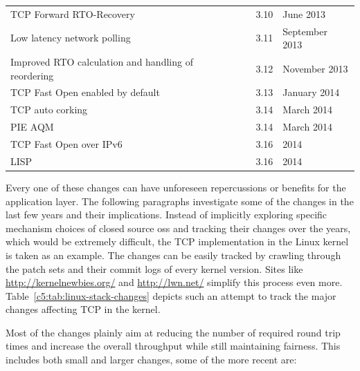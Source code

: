 \begin{table}[htbp]
\begin{tabu}{X[1.4]X[0.6]X[0.4]X[0.7]}
	\gls{TCP} Forward RTO-Recovery & \cite{rfc5682} & 3.10 & June 2013 \\
	Low latency network polling & & 3.11 & September 2013 \\ %
	Improved RTO calculation and handling of reordering & & 3.12 & November 2013 \\ %
	\gls{TCP} Fast Open enabled by default & & 3.13 & January 2014 \\
	\gls{TCP} auto corking & & 3.14 & March 2014 \\ %
	PIE \acrshort{AQM} & & 3.14 & March 2014 \\ %
	\gls{TCP} Fast Open over IPv6 & & 3.16 & 2014 \\
	LISP & \cite{rfc6830} & 3.16 & 2014 \\
	\bottomrule
	\end{tabu}
\end{table}

Every one of these changes can have unforeseen repercussions or benefits for the application layer. The following paragraphs investigate some of the changes in the last few years and their implications.  Instead of implicitly exploring specific mechanism choices of closed source \glspl{os} and tracking their changes over the years, which would be extremely difficult, the \gls{TCP} implementation in the Linux kernel is taken as an example. The changes can be easily tracked by crawling through the patch sets and their commit logs of every kernel version. Sites like \url{http://kernelnewbies.org/} and \url{http://lwn.net/} simplify this process even more. Table~\ref{c5:tab:linux-stack-changes} depicts such an attempt to track the major changes affecting \gls{TCP} in the kernel.

Most of the changes plainly aim at reducing the number of required round trip times and increase the overall throughput while still maintaining fairness. This includes both small and larger changes, some of the more recent are:

